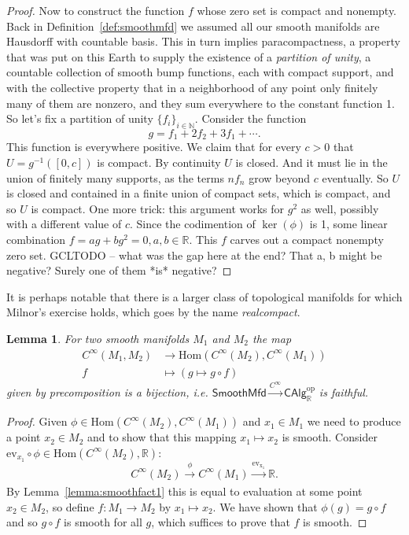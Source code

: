 \documentclass[12pt]{article}
\newcommand{\Hom}{\mathrm{Hom}}
\newcommand{\rr}{\ensuremath{\mathbb{R}}}
\newcommand{\nn}{\ensuremath{\mathbb{N}}}
\newcommand{\cinfty}{\ensuremath{C^{\infty}}}
\newcommand{\smfd}{\textsf{SmoothMfd}}
\newcommand{\calg}{\textsf{CAlg}_{\rr}}
\newtheorem{mylemma}{Lemma}
\begin{document}
\begin{proof}
Now to construct the function $f$ whose zero set is compact and nonempty. Back in Definition~\ref{def:smoothmfd} we assumed all our smooth manifolds are Hausdorff with countable basis. This in turn implies paracompactness, a property that was put on this Earth to supply the existence of a \emph{partition of unity}, a countable collection of smooth bump functions, each with compact support, and with the collective property that in a neighborhood of any point only finitely many of them are nonzero, and they sum everywhere to the constant function 1. So let's fix a partition of unity $\{f_i\}_{i\in\nn}$. Consider the function $$g=f_1+2f_2+3f_1+\cdots.$$
This function is everywhere positive. We claim that for every $c>0$ that $U=g^{-1}([0,c])$ is compact. By continuity $U$ is closed. And it must lie in the union of finitely many supports, as the terms $nf_n$ grow beyond $c$ eventually. So $U$ is closed and contained in a finite union of compact sets, which is compact, and so $U$ is compact. One more trick: this argument works for $g^2$ as well, possibly with a different value of $c$. Since the codimention of $\ker(\phi)$ is 1, some linear combination $f=ag+bg^2=0, a, b\in\rr$. This $f$ carves out a compact nonempty zero set. GCLTODO -- what was the gap here at the end? That a, b might be negative? Surely one of them *is* negative?
\end{proof}
It is perhaps notable that there is a larger class of topological manifolds for which Milnor's exercise holds, which goes by the name \emph{realcompact}.

\begin{mylemma}\label{lemma:smoothfact2} For two smooth manifolds $M_1$ and $M_2$ the map
\begin{align}
\cinfty(M_1, M_2) &\to \Hom(\cinfty(M_2),\cinfty(M_1)) \\
f &\mapsto (g\mapsto g\circ f)
\end{align}
given by precomposition is a bijection, i.e. $\smfd\xrightarrow[]{\cinfty}\calg^{\mathrm{op}}$ is faithful.
\end{mylemma}
\begin{proof}
Given $\phi\in\Hom(\cinfty(M_2),\cinfty(M_1))$ and $x_1\in M_1$ we need to produce a point $x_2\in M_2$ and to show that this mapping $x_1\mapsto x_2$ is smooth. Consider $\mathrm{ev}_{x_1}\circ\phi\in\Hom(\cinfty(M_2),\rr)$: $$\cinfty(M_2)\xrightarrow[]{\phi}\cinfty(M_1)\xrightarrow[]{\mathrm{ev_{x_1}}} \rr.$$
By Lemma~\ref{lemma:smoothfact1} this is equal to evaluation at some point $x_2\in M_2$, so define $f:M_1\to M_2$ by $x_1\mapsto x_2$. We have shown that $\phi(g)=g\circ f$ and so $g\circ f$ is smooth for all $g$, which suffices to prove that $f$ is smooth.
\end{proof}
\end{document}
